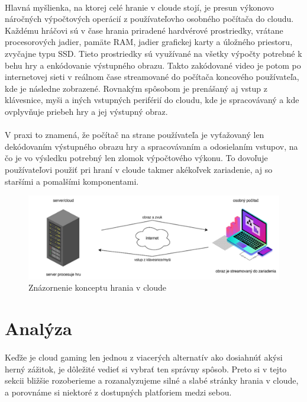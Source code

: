 \documentclass[10pt,twoside,slovak,a4paper]{article}
\begin{document}
\paragraph{} Hlavná myšlienka, na ktorej celé hranie v cloude stojí, je presun výkonovo náročných výpočtových operácií z používateľovho osobného počítača do cloudu. Každému hráčovi sú v čase hrania priradené hardvérové prostriedky, vrátane procesorových jadier, pamäte RAM, jadier grafickej karty a úložného priestoru, zvyčajne typu SSD. Tieto prostriedky sú využívané na všetky výpočty potrebné k behu hry a enkódovanie výstupného obrazu. Takto zakódované video je potom po internetovej sieti v reálnom čase streamované do počítača koncového používateľa, kde je následne zobrazené. Rovnakým spôsobom je prenášaný aj vstup z klávesnice, myši a iných vstupných periférií do cloudu, kde je spracovávaný a kde ovplyvňuje priebeh hry a jej výstupný obraz.\cite{6882299}

\paragraph{} V praxi to znamená, že počítač na strane používateľa je vyťažovaný len dekódovaním výstupného obrazu hry a spracovávaním a odosielaním vstupov, na čo je vo výsledku potrebný len zlomok výpočtového výkonu. To dovoľuje používateľovi použiť pri hraní v cloude takmer akékoľvek zariadenie, aj so staršími a pomalšími komponentami.

\begin{figure}[H]
	\includegraphics[width=1.0\textwidth]{diagram.pdf}
	\caption{Znázornenie konceptu hrania v cloude\cite{6882299}}
	\label{fig:cloud-gaming-concept}
\end{figure}



\section {Analýza}

\paragraph{} Keďže je cloud gaming len jednou z viacerých alternatív ako dosiahnúť akýsi herný zážitok, je dôležité vedieť si vybrať ten správny spôsob. Preto si v tejto sekcii bližšie rozoberieme a rozanalyzujeme silné a slabé stránky hrania v cloude, a porovnáme si niektoré z dostupných platforiem medzi sebou.
\end{document}
